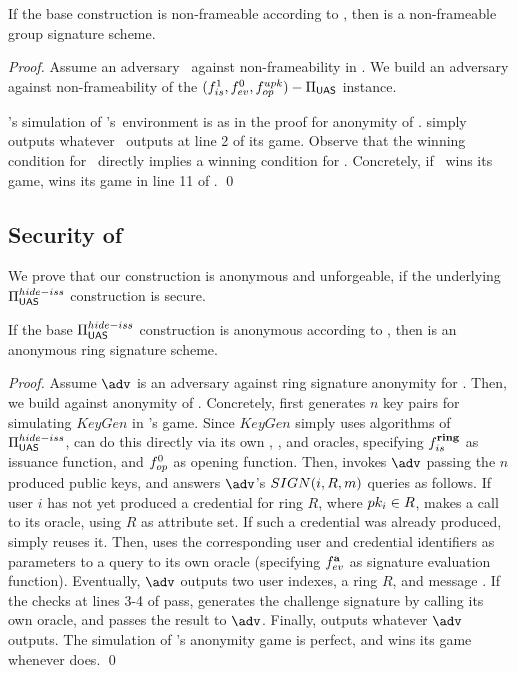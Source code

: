 \begin{theorem}
  If the base \CUASGen construction is non-frameable according to
  , then \CUASGS is a non-frameable group signature
  scheme.
\end{theorem}

\begin{proof}
  Assume an adversary \adv~against non-frameability in \CUASGS. We build an
  adversary \advB against non-frameability of the $(f_{is}^1,f_{ev}^0,
  f_{op}^{upk})-\Pi_{\mathsf{UAS}}$ instance.
  
  \advB's simulation of \adv's~environment is as in the proof for anonymity
  of \CUASGS. \advB simply outputs whatever \adv~outputs at line 2 of its
  game. Observe that the winning condition for \adv~directly implies a winning
  condition for \advB. Concretely, if \adv~wins its game, \advB wins its game
  in line 11 of \ExpNonframe.
  \qed
\end{proof}

\subsection{Security of \CUASRing}

We prove that our \CUASRing construction is anonymous and unforgeable, if
the underlying $\Pi_{\mathsf{UAS}}^{hide-iss}$ construction is secure.

\begin{theorem}
  If the base $\Pi_{\mathsf{UAS}}^{hide-iss}$ construction is anonymous according to
  , then \CUASRing is an anonymous ring signature
  scheme.
\end{theorem}

\begin{proof}
  Assume $\adv$ is an adversary against ring signature anonymity for \CUASRing.
  Then, we build \advB against anonymity of \CUASGen. Concretely, \advB first
  generates $n$ key pairs for \adv simulating $KeyGen$ in \adv's game. Since
  $KeyGen$ simply uses algorithms of $\Pi_{\mathsf{UAS}}^{hide-iss}$, \advB can do this
  directly via its own \HUGEN, \ISET, and \OGEN oracles, specifying
  $f_{is}^{\mathbf{ring}}$ as issuance function, and $f_{op}^0$ as opening function.
  Then, \advB invokes $\adv$ passing the $n$ produced public keys, and
  answers $\adv$'s $SIGN(i,R,m)$ queries as follows. If user $i$ has not yet
  produced a credential for ring $R$, where $pk_i \in R$, \advB makes a call to
  its \OBTAIN oracle, using $R$ as attribute set. If such a credential was already
  produced, \advB simply reuses it. Then, \advB uses the corresponding user and
  credential identifiers as parameters to a query to its own \SIGN oracle
  (specifying $f_{ev}^{\mathbf{a}}$ as signature evaluation function). Eventually,
  $\adv$ outputs two user indexes, a ring $R$, and message \msg. If the checks
  at lines 3-4 of  pass, \advB generates the challenge
  signature by calling its own \CHALb oracle, and passes the result to $\adv$.
  Finally, \advB outputs whatever $\adv$ outputs.
  The simulation of \adv's anonymity game is perfect, and \advB wins its game
  whenever \adv does.
  \qed
\end{proof}

